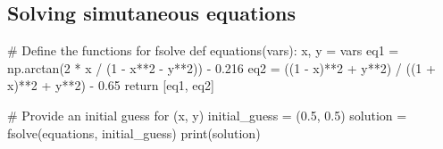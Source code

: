 \documentclass{article}
\begin{document}
\subsection{Solving simutaneous equations} \label{eq:solved}
\begin{python}
# Define the functions for fsolve
def equations(vars):
    x, y = vars
    eq1 = np.arctan(2 * x / (1 - x**2 - y**2)) - 0.216
    eq2 = ((1 - x)**2 + y**2) / ((1 + x)**2 + y**2) - 0.65
    return [eq1, eq2]

# Provide an initial guess for (x, y)
initial_guess = (0.5, 0.5)
solution = fsolve(equations, initial_guess)
print(solution)
\end{python}
\end{document}
